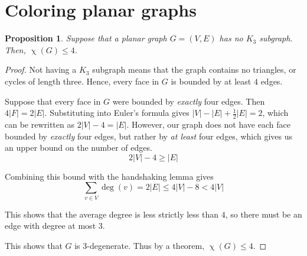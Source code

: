 \documentclass[12pt,letterpaper]{article}
\newcommand{\question}{\section}
\newtheorem{prop}{Proposition}
\DeclareMathOperator{\degOp}{deg}
\newcommand{\parens}[1]{\left(#1\right)}
\renewcommand{\deg}[1]{\degOp{\parens{#1}}}
\DeclareMathOperator{\chromOp}{\chi}
\newcommand{\chrom}[1]{\chromOp{\parens{#1}}}
\newcommand{\half}{\frac{1}{2}}
\begin{document}
\question{Coloring planar graphs}

\begin{prop}
    Suppose that a planar graph $G = (V, E)$ has no $K_3$ subgraph.
    Then, $\chrom{G} \leq 4$.
\end{prop}

\begin{proof}
    Not having a $K_3$ subgraph means that the graph contains no triangles, or
    cycles of length three. Hence, every face in $G$ is bounded by at least $4$
    edges.

    Suppose that every face in $G$ were bounded by \emph{exactly} four edges.
    Then $4|F| = 2|E|$.
    Substituting into Euler's formula gives $|V| - |E| + \half |E| = 2$, which
    can be rewritten as $2|V| - 4 = |E|$. However, our graph does not have each
    face bounded by \emph{exactly} four edges, but rather by \emph{at least}
    four edges, which gives us an upper bound on the number of edges.
    \begin{equation}
        \label{eq:edge-upper-bound}
        2|V| - 4 \geq |E|
    \end{equation}

    Combining this bound with the handshaking lemma gives
    \begin{equation}
        \label{eq:bounded-handshake}
        \sum_{v \in V} \deg{v} = 2 |E| \leq 4 |V| - 8 < 4 |V|
    \end{equation}

    This shows that the average degree is less strictly less than $4$, so there
    must be an edge with degree at most $3$.

    This shows that $G$ is $3$-degenerate.
    Thus by a theorem, $\chrom{G} \leq 4$.
\end{proof}
\end{document}
